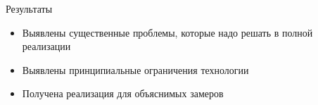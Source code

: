 \documentclass{beamer}
\begin{document}

    \begin{frame}{Результаты}
        \begin{itemize}
            \item Выявлены существенные проблемы, которые надо решать в полной реализации
            \item Выявлены принципиальные ограничения технологии
            \item Получена реализация для объяснимых замеров
        \end{itemize}
    \end{frame}
\end{document}
